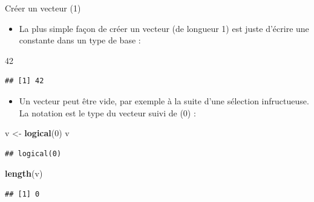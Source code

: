 \documentclass[
  ignorenonframetext,
]{beamer}
\newenvironment{Shaded}{\begin{snugshade}}{\end{snugshade}}
\newcommand{\DecValTok}[1]{\textcolor[rgb]{0.00,0.00,0.81}{#1}}
\newcommand{\FunctionTok}[1]{\textcolor[rgb]{0.13,0.29,0.53}{\textbf{#1}}}
\newcommand{\NormalTok}[1]{#1}
\newcommand{\OtherTok}[1]{\textcolor[rgb]{0.56,0.35,0.01}{#1}}
\providecommand{\tightlist}{%
  \setlength{\itemsep}{0pt}\setlength{\parskip}{0pt}}
\begin{document}
\begin{frame}[fragile]{Créer un vecteur (1)}
\protect\hypertarget{cruxe9er-un-vecteur-1}{}
\begin{itemize}
\tightlist
\item
  La plus simple façon de créer un vecteur (de longueur 1) est juste
  d'écrire une constante dans un type de base :
\end{itemize}

\tiny

\begin{Shaded}
\begin{Highlighting}[]
\DecValTok{42}
\end{Highlighting}
\end{Shaded}

\begin{verbatim}
## [1] 42
\end{verbatim}

\normalsize

\begin{itemize}
\tightlist
\item
  Un vecteur peut être vide, par exemple à la suite d'une sélection
  infructueuse. La notation est le type du vecteur suivi de (0) :
\end{itemize}

\tiny

\begin{Shaded}
\begin{Highlighting}[]
\NormalTok{v }\OtherTok{\textless{}{-}} \FunctionTok{logical}\NormalTok{(}\DecValTok{0}\NormalTok{)}
\NormalTok{v}
\end{Highlighting}
\end{Shaded}

\begin{verbatim}
## logical(0)
\end{verbatim}

\begin{Shaded}
\begin{Highlighting}[]
\FunctionTok{length}\NormalTok{(v)}
\end{Highlighting}
\end{Shaded}

\begin{verbatim}
## [1] 0
\end{verbatim}

\normalsize
\end{frame}
\end{document}
